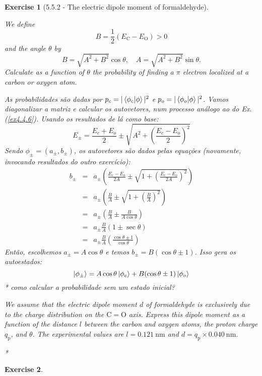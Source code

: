 \documentclass[12pt]{article}
\def\be{\begin{equation}}
\def\ee{\end{equation}}
\def\bea{\begin{eqnarray*}}
\def\eea{\end{eqnarray*}}
\def\f{\frac}
\def\l{\left}
\def\r{\right}
\newtheorem{exercise}{Exercise}
\begin{document}
\begin{exercise}[5.5.2 - The electric dipole moment of formaldehyde]
\begin{exercises}
			\item We define
			$$
			B=\frac{1}{2}\left(E_{\mathrm{C}}-E_{\mathrm{O}}\right)>0
			$$
			and the angle $\theta$ by
			$$
			B=\sqrt{A^{2}+B^{2}} \cos \theta, \quad A=\sqrt{A^{2}+B^{2}} \sin \theta .
			$$
			Calculate as a function of $\theta$ the probability of finding a $\pi$ electron localized at a carbon or oxygen atom.
			\begin{multianswer}
				As probabilidades são dadas por $p_c = |\braket{\phi_c | \phi}|^2$ e $p_o = |\braket{\phi_o | \phi}|^2$. Vamos diagonalizar a matriz e calcular os autovetores, num processo análogo ao do Ex.(\ref{ex4.4.6}). Usando os resultados de lá como base:
				\be
					E_{\pm} = \f{E_c + E_o}{2} \pm \sqrt{A^2 + \l(\f{E_c - E_o}{2}\r)^2}
				\ee
				Sendo $\phi_\pm = (a_\pm, b_\pm)$, os autovetores são dados pelas equações (novamente, invocando resultados do outro exercício):
				\bea
					b_\pm &=& a_\pm\l( \f{E_c - E_o}{2A} \pm \sqrt{1 + \l(\f{E_c - E_o}{2A}\r)^2}\r) \\
						&=& a_\pm \l( \f{B}{A} \pm \sqrt{1 + \l(\f{B}{A}\r)^2}\r) \\
						&=& a_\pm \l( \f{B}{A} \pm \f{B}{A\cos\theta}\r) \\
						&=& a_\pm \f{B}{A}( 1 \pm \sec\theta) \\
						&=& a_\pm \f{B}{A} \l( \f{\cos\theta \pm 1}{\cos\theta} \r)
				\eea
				Então, escolhemos $a_\pm = A\cos\theta$ e temos $b_\pm = B(\cos\theta\pm 1)$. Isso gera os autoestados:
				\be
					\ket{\phi_\pm} = A\cos\theta\ket{\phi_e} + B(\cos\theta\pm 1)\ket{\phi_o}
				\ee
				* como calcular a probabilidade sem um estado inicial?
			\end{multianswer}
			\item We assume that the electric dipole moment $d$ of formaldehyde is exclusively due to the charge distribution on the $\mathrm{C}=\mathrm{O}$ axis. Express this dipole moment as a function of the distance $l$ between the carbon and oxygen atoms, the proton charge $q_{\mathrm{p}}$, and $\theta$. The experimental values are $l=0.121 \mathrm{~nm}$ and $d=q_{\mathrm{p}} \times 0.040 \mathrm{~nm}$.
			\begin{multianswer}[true]
				*		
			\end{multianswer}
		\end{exercises}		
	\end{exercise}

	\begin{exercise}
		
	\end{exercise}
	
\end{document}
